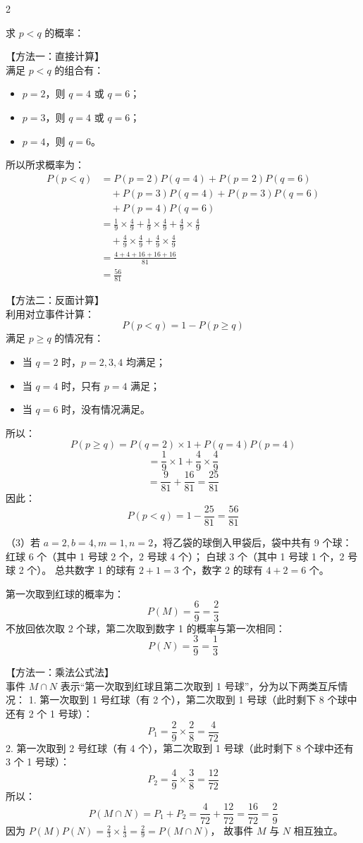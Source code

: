 \documentclass[11pt,a4paper]{ctexart}
\begin{document}
\begin{paracol}{2}
{求 $p < q$ 的概率：

【方法一：直接计算】\\
满足 $p < q$ 的组合有：
\begin{itemize}
  \item $p=2$，则 $q=4$ 或 $q=6$；
  \item $p=3$，则 $q=4$ 或 $q=6$；
  \item $p=4$，则 $q=6$。
\end{itemize}
所以所求概率为：
$$\begin{aligned}
P(p < q) &= P(p=2)P(q=4) + P(p=2)P(q=6) \\
&\quad + P(p=3)P(q=4) + P(p=3)P(q=6) \\
&\quad + P(p=4)P(q=6) \\
&= \frac{1}{9}\times\frac{4}{9} + \frac{1}{9}\times\frac{4}{9} + \frac{4}{9}\times\frac{4}{9} \\
&\quad + \frac{4}{9}\times\frac{4}{9} + \frac{4}{9}\times\frac{4}{9} \\
&= \frac{4 + 4 + 16 + 16 + 16}{81} \\
&= \frac{56}{81}
\end{aligned}$$

【方法二：反面计算】\\
利用对立事件计算：
$$P(p < q) = 1 - P(p \ge q)$$
满足 $p \ge q$ 的情况有：
\begin{itemize}
  \item 当 $q=2$ 时，$p=2, 3, 4$ 均满足；
  \item 当 $q=4$ 时，只有 $p=4$ 满足；
  \item 当 $q=6$ 时，没有情况满足。
\end{itemize}
所以：
$$P(p \ge q) = P(q=2)\times 1 + P(q=4)P(p=4)$$
$$= \frac{1}{9}\times 1 + \frac{4}{9}\times\frac{4}{9}$$
$$= \frac{9}{81} + \frac{16}{81} = \frac{25}{81}$$
因此：
$$P(p < q) = 1 - \frac{25}{81} = \frac{56}{81}$$

（3）若 $a=2, b=4, m=1, n=2$，将乙袋的球倒入甲袋后，袋中共有 9 个球：
红球 6 个（其中 1 号球 2 个，2 号球 4 个）；
白球 3 个（其中 1 号球 1 个，2 号球 2 个）。
总共数字 1 的球有 $2+1=3$ 个，数字 2 的球有 $4+2=6$ 个。

第一次取到红球的概率为：
$$P(M) = \frac{6}{9} = \frac{2}{3}$$
不放回依次取 2 个球，第二次取到数字 1 的概率与第一次相同：
$$P(N) = \frac{3}{9} = \frac{1}{3}$$

【方法一：乘法公式法】\\
事件 $M \cap N$ 表示“第一次取到红球且第二次取到 1 号球”，分为以下两类互斥情况：
1. 第一次取到 1 号红球（有 2 个），第二次取到 1 号球（此时剩下 8 个球中还有 2 个 1 号球）：
$$P_1 = \frac{2}{9}\times\frac{2}{8} = \frac{4}{72}$$
2. 第一次取到 2 号红球（有 4 个），第二次取到 1 号球（此时剩下 8 个球中还有 3 个 1 号球）：
$$P_2 = \frac{4}{9}\times\frac{3}{8} = \frac{12}{72}$$
所以：
$$P(M\cap N) = P_1 + P_2 = \frac{4}{72} + \frac{12}{72} = \frac{16}{72} = \frac{2}{9}$$
因为 $P(M)P(N) = \frac{2}{3}\times\frac{1}{3} = \frac{2}{9} = P(M\cap N)$，
故事件 $M$ 与 $N$ 相互独立。

}
\end{paracol}
\end{document}
